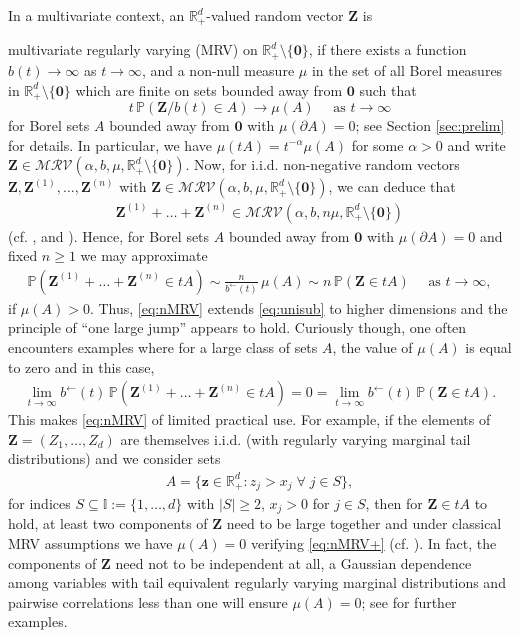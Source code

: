 \documentclass[aos]{imsart}
\numberwithin{equation}{section}
\theoremstyle{plain} %
\theoremstyle{remark}
\renewcommand\P{\mathbb{P}}
\newcommand{\R}{\mathbb{R}}
\def\MRV{\mathcal{MRV}}
\def\bzero{\boldsymbol 0}
\def\bZ{\boldsymbol Z}
\def\bz{\boldsymbol z}
\begin{document}
In a multivariate context, an $\R_+^d$-valued random vector $\bZ$ is {multivariate regularly varying (MRV) on $\R_+^d\setminus\{\bzero\}$, if there exists a function $b(t)\to \infty$ as $t\to \infty$, and a non-null measure $\mu$ in the set of all Borel measures in $\R_+^d\setminus\{\bzero\}$ which are finite on sets bounded away from $\bzero$ such that
\[t\,\P(\bZ/b(t) \in A) \to \mu(A) \quad \text{ as } t\to\infty \]
for Borel sets $A$ bounded away from $\bzero$ with $\mu(\partial A)=0$; see Section \ref{sec:prelim} for details. In particular, we have $\mu(tA)=t^{-\alpha}\mu(A)$ for some $\alpha>0$ and write $\bZ\in \MRV(\alpha, b, \mu, \R_+^d\setminus\{\bzero\})$. Now, for i.i.d. non-negative random vectors $\bZ,\bZ^{(1)}, \ldots, \bZ^{(n)}$  with $\bZ \in \MRV(\alpha, b, \mu, \R_+^d\setminus\{\bzero\})$, we can deduce that
\begin{eqnarray} \label{eq:3}
    \bZ^{(1)} + \ldots + \bZ^{(n)} \in \MRV(\alpha, b, n \mu, \R_+^d\setminus\{\bzero\})
\end{eqnarray}
(cf. {\cite[Proposition 4.1]{resnick:1986}}, \cite[Section 7.3]{resnickbook:2007} and \cite[Lemma 3.11]{jessen:mikosch:2006}). Hence, for Borel sets $A$ bounded away from $\bzero$ with $\mu(\partial A)=0$ and fixed $n\ge 1$  we may approximate
\begin{align}\label{eq:nMRV}
\P(\bZ^{(1)} + \ldots + \bZ^{(n)} \in tA) \sim  \frac{n}{b^{\leftarrow}(t)}\,\mu(A) \sim n \,\P(\bZ\in tA)
\quad \text{ as } t\to\infty,
\end{align}
 if $\mu(A)>0$. Thus, \eqref{eq:nMRV} extends \eqref{eq:unisub} to higher dimensions and the principle of ``one large jump'' appears to hold.  Curiously though, one often encounters examples where for a large class of sets $A$, the value of $\mu(A)$ is equal to zero and in this case,
 \begin{align}\label{eq:nMRV+}
    \lim_{t\to\infty}b^{\leftarrow}(t)\,\P(\bZ^{(1)} + \ldots + \bZ^{(n)} \in tA)=0=  \lim_{t\to\infty}b^{\leftarrow}(t)\,\P(\bZ\in tA).
\end{align}
This makes \eqref{eq:nMRV} of limited practical use. For example, if the elements of $\bZ=(Z_1,\ldots,Z_d)$ are themselves i.i.d. (with regularly varying marginal tail distributions) and
  we consider sets
\begin{align}\label{eq:setA}
A=\{\bz\in \R_+^d: z_j > x_j \; \forall\; j \in S\},
\end{align} for indices $S\subseteq \mathbb{I}:=\{1,\ldots,d\}$ with $|S|\ge 2$, $x_j>0$ for $j\in S$, then for $\bZ\in tA$ to hold, at least two components of $\bZ$ need to be large together and under classical MRV assumptions we have $\mu(A)=0$ verifying \eqref{eq:nMRV+} (cf. ). In fact, the components of $\bZ$ need not to be independent at all, a Gaussian dependence among variables with tail equivalent regularly varying marginal distributions and pairwise correlations less than one will ensure $\mu(A)=0$;  see  for further examples.

}
\end{document}
